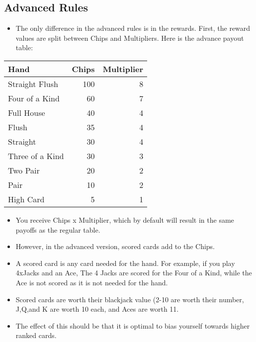 \documentclass[11pt]{article}
\begin{document}
\subsection{Advanced Rules}
\label{sec:org625d069}
\begin{itemize}
\item The only difference in the advanced rules is in the rewards.  First, the reward values are split between Chips and Multipliers.  Here is the advance payout table:
\end{itemize}
\begin{center}
\begin{tabular}{lrr}
Hand & Chips & Multiplier\\[0pt]
\hline
Straight Flush & 100 & 8\\[0pt]
Four of a Kind & 60 & 7\\[0pt]
Full House & 40 & 4\\[0pt]
Flush & 35 & 4\\[0pt]
Straight & 30 & 4\\[0pt]
Three of a Kind & 30 & 3\\[0pt]
Two Pair & 20 & 2\\[0pt]
Pair & 10 & 2\\[0pt]
High Card & 5 & 1\\[0pt]
\end{tabular}
\end{center}
\begin{itemize}
\item You receive Chips x Multiplier, which by default will result in the same payoffs as the regular table.
\item However, in the advanced version, scored cards add to the Chips.
\item A scored card is any card needed for the hand.  For example, if you play 4xJacks and an Ace, The 4 Jacks are scored for the Four of a Kind, while the Ace is not scored as it is not needed for the hand.
\item Scored cards are worth their blackjack value (2-10 are worth their number, J,Q,and K are worth 10 each, and Aces are worth 11.
\item The effect of this should be that it is optimal to bias yourself towards higher ranked cards.
\end{itemize}
\end{document}
